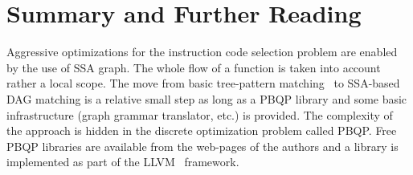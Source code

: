 

\section{Summary and Further Reading}
Aggressive optimizations for the instruction code selection problem are enabled by the use of SSA graph.
The whole flow of a function is taken into account
rather a local scope. The move from basic tree-pattern
matching~\cite{aj:76} to SSA-based DAG matching is a relative small
step as long as a PBQP library and some basic infrastructure (graph
grammar translator, etc.)  is provided. The complexity of the approach
is hidden in the discrete optimization problem called PBQP. Free PBQP
libraries are available from the web-pages of the authors and a
library is implemented as part of the LLVM~\cite{wwwLLVM} framework.

